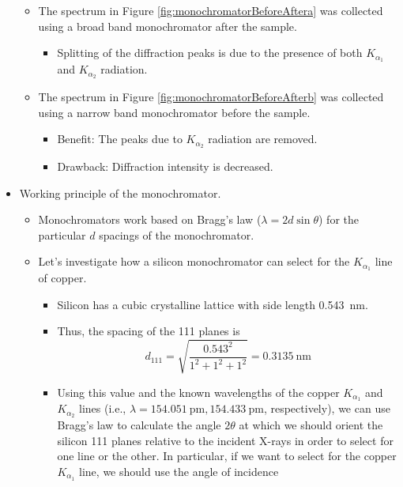 \documentclass[../notes.tex]{subfiles}
\begin{document}
\begin{itemize}
\begin{itemize}
        \item The spectrum in Figure \ref{fig:monochromatorBeforeAftera} was collected using a broad band monochromator after the sample.
        \begin{itemize}
            \item Splitting of the diffraction peaks is due to the presence of both $K_{\alpha_1}$ and $K_{\alpha_2}$ radiation.
        \end{itemize}
        \item The spectrum in Figure \ref{fig:monochromatorBeforeAfterb} was collected using a narrow band monochromator before the sample.
        \begin{itemize}
            \item Benefit: The peaks due to $K_{\alpha_2}$ radiation are removed.
            \item Drawback: Diffraction intensity is decreased.
        \end{itemize}
    \end{itemize}
    \item Working principle of the monochromator.
    \begin{itemize}
        \item Monochromators work based on Bragg's law ($\lambda=2d\sin\theta$) for the particular $d$ spacings of the monochromator.
        \item Let's investigate how a silicon monochromator can select for the $K_{\alpha_1}$ line of copper.
        \begin{itemize}
            \item Silicon has a cubic crystalline lattice with side length \SI{0.543}{\nano\meter}.
            \item Thus, the spacing of the 111 planes is
            \begin{equation*}
                d_{111} = \sqrt{\frac{0.543^2}{1^2+1^2+1^2}} = \SI{0.3135}{\nano\meter}
            \end{equation*}
            \item Using this value and the known wavelengths of the copper $K_{\alpha_1}$ and $K_{\alpha_2}$ lines (i.e., $\lambda=\SI{154.051}{\pico\meter},\SI{154.433}{\pico\meter}$, respectively), we can use Bragg's law to calculate the angle $2\theta$ at which we should orient the silicon 111 planes relative to the incident X-rays in order to select for one line or the other. In particular, if we want to select for the copper $K_{\alpha_1}$ line, we should use the angle of incidence
            \begin{equation*}

\end{equation*}
\end{itemize}
\end{itemize}
\end{itemize}
\end{document}
